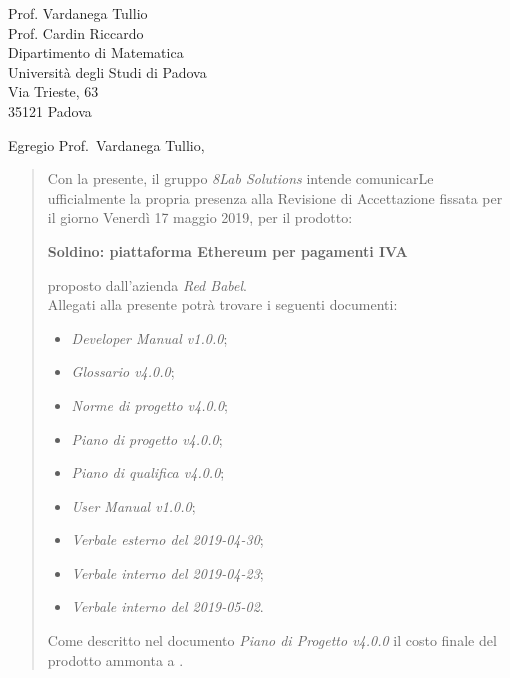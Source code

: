 
\begin{letter}{
		Prof. Vardanega Tullio \\
		Prof. Cardin Riccardo \\
		Dipartimento di Matematica \\
		Università degli Studi di Padova \\
		Via Trieste, 63 \\
		35121 Padova}
		
\opening{Egregio Prof.~Vardanega Tullio,}

\begin{quotation}
Con la presente, il gruppo \textit{8Lab Solutions} intende 
comunicarLe ufficialmente la propria presenza alla Revisione di 
Accettazione fissata per il giorno Venerdì 17 maggio 2019, per il prodotto:

\begin{center}
	\textbf{Soldino: piattaforma Ethereum per pagamenti IVA}
\end{center}

\noindent proposto dall'azienda \textit{Red Babel}. \\
Allegati alla presente potrà trovare i seguenti documenti:

\begin{itemize}
	
	\item \textit{Developer Manual v1.0.0};
	
	\item \textit{Glossario v4.0.0};
	
	\item \textit{Norme di progetto v4.0.0};

	\item \textit{Piano di progetto v4.0.0};

	\item \textit{Piano di qualifica v4.0.0};
	
	\item \textit{User Manual v1.0.0};
	
	
	\item \textit{Verbale esterno del 2019-04-30};
	\item \textit{Verbale interno del 2019-04-23};
	\item \textit{Verbale interno del 2019-05-02}.
\end{itemize}
	


\noindent Come descritto nel documento \textit{Piano di Progetto v4.0.0} il 
costo finale del prodotto ammonta a \textbf{}.\\


\end{quotation}
\end{letter}
